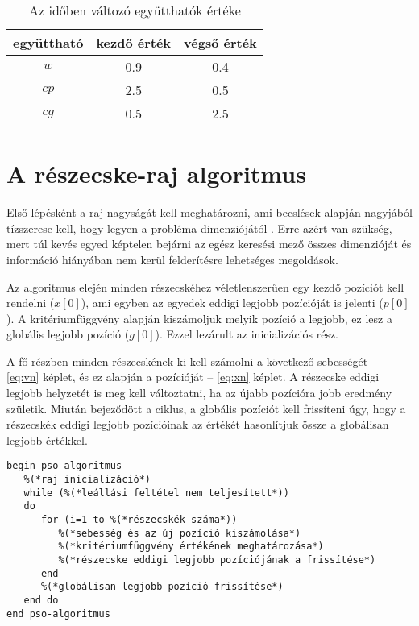 \begin{table}
    \centering
    \begin{tabular}{|c|c|c|}
    \hline
    együttható & kezdő érték & végső érték \\ \hline
    \hline
    $w$ & 0.9 & 0.4 \\ \hline
    $cp$ & 2.5 & 0.5 \\ \hline
    $cg$ & 0.5 & 2.5 \\ \hline
    \end{tabular}
    \caption{Az időben változó együtthatók értéke \parencite{kanovic2017}}
    \label{tab:psokomp}
\end{table}

\section{A részecske-raj algoritmus}

Első lépésként a raj nagyságát kell meghatározni, ami becslések alapján nagyjából tízszerese kell, hogy legyen a probléma dimenziójától \parencite{rapaic2019}. Erre azért van szükség, mert túl kevés egyed képtelen bejárni az egész keresési mező összes dimenzióját és információ hiányában nem kerül felderítésre lehetséges megoldások.

Az algoritmus elején minden részecskéhez véletlenszerűen egy kezdő pozíciót kell rendelni ($x[0]$), ami egyben az egyedek eddigi legjobb pozícióját is jelenti ($p[0]$). A kritériumfüggvény alapján kiszámoljuk melyik pozíció a legjobb, ez lesz a globális legjobb pozíció ($g[0]$). Ezzel lezárult az inicializációs rész.

A fő részben minden részecskének ki kell számolni a következő sebességét -- \ref{eq:vn} képlet, és ez alapján a pozícióját -- \ref{eq:xn} képlet. A részecske eddigi legjobb helyzetét is meg kell változtatni, ha az újabb pozícióra jobb eredmény születik. Miután bejeződött a ciklus, a globális pozíciót kell frissíteni úgy, hogy a részecskék eddigi legjobb pozícióinak az értékét hasonlítjuk össze a globálisan legjobb értékkel.

\linespread{1}
\begin{lstlisting}[caption={A részecske-raj algoritmus pszeudokódja \parencite{dorigo2008}}, captionpos=b]
begin pso-algoritmus
   %(*raj inicializáció*)
   while (%(*leállási feltétel nem teljesített*))
   do
      for (i=1 to %(*részecskék száma*))
         %(*sebesség és az új pozíció kiszámolása*)
         %(*kritériumfüggvény értékének meghatározása*)
         %(*részecske eddigi legjobb pozíciójának a frissítése*)
      end
      %(*globálisan legjobb pozíció frissítése*)
   end do
end pso-algoritmus
\end{lstlisting}

